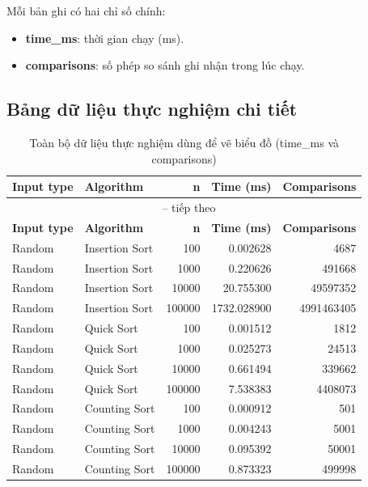 Mỗi bản ghi có hai chỉ số chính:
\begin{itemize}[leftmargin=1.2cm]
    \item \textbf{time\_ms}: thời gian chạy (ms).
    \item \textbf{comparisons}: số phép so sánh ghi nhận trong lúc chạy.
\end{itemize}

\subsection{Bảng dữ liệu thực nghiệm chi tiết}

\begin{center}
\scriptsize
\setlength{\LTleft}{0pt}
\setlength{\LTright}{0pt}
\begin{longtable}{llrrr}
\caption{Toàn bộ dữ liệu thực nghiệm dùng để vẽ biểu đồ (time\_ms và comparisons)}\label{tab:raw-benchmark-data}\\
\toprule
\textbf{Input type} & \textbf{Algorithm} & \textbf{n} & \textbf{Time (ms)} & \textbf{Comparisons} \\
\midrule
\endfirsthead

\multicolumn{5}{c}{\tablename\ \thetable{} -- tiếp theo}\\
\toprule
\textbf{Input type} & \textbf{Algorithm} & \textbf{n} & \textbf{Time (ms)} & \textbf{Comparisons} \\
\midrule
\endhead

\bottomrule
\endfoot

Random & Insertion Sort & 100 & 0.002628 & 4687 \\
Random & Insertion Sort & 1000 & 0.220626 & 491668 \\
Random & Insertion Sort & 10000 & 20.755300 & 49597352 \\
Random & Insertion Sort & 100000 & 1732.028900 & 4991463405 \\
Random & Quick Sort & 100 & 0.001512 & 1812 \\
Random & Quick Sort & 1000 & 0.025273 & 24513 \\
Random & Quick Sort & 10000 & 0.661494 & 339662 \\
Random & Quick Sort & 100000 & 7.538383 & 4408073 \\
Random & Counting Sort & 100 & 0.000912 & 501 \\
Random & Counting Sort & 1000 & 0.004243 & 5001 \\
Random & Counting Sort & 10000 & 0.095392 & 50001 \\
Random & Counting Sort & 100000 & 0.873323 & 499998 \\


\end{longtable}
\end{center}
